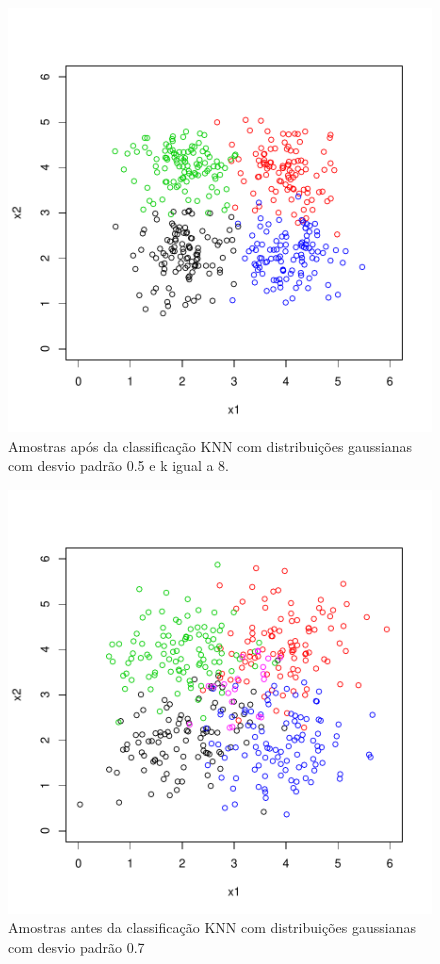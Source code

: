 \documentclass[12pt]{article}
\begin{document}
\begin{figure}[h]
\centering
\includegraphics{knn-015}
\caption{Amostras após da classificação KNN com distribuições gaussianas com desvio padrão 0.5 e k igual a 8.}
\label{sd_0.5}
\end{figure}


\begin{figure}[h]
\centering
\includegraphics{knn-017}
\caption{Amostras antes da classificação KNN com distribuições gaussianas com desvio padrão 0.7}
\label{sd_0.7}
\end{figure}
\end{document}
